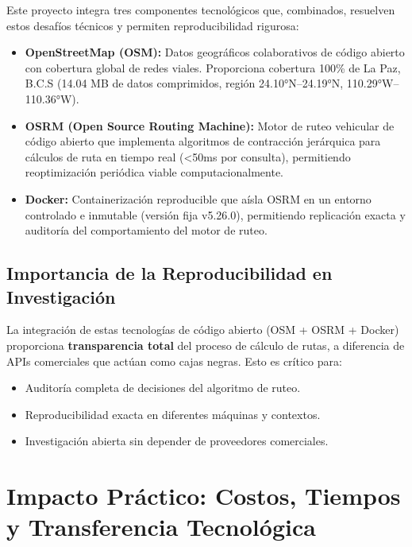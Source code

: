 Este proyecto integra tres componentes tecnológicos que, combinados, resuelven 
estos desafíos técnicos y permiten reproducibilidad rigurosa:

\begin{itemize}
    \item \textbf{OpenStreetMap (OSM):} Datos geográficos colaborativos de 
    código abierto con cobertura global de redes viales. Proporciona cobertura 
    100\% de La Paz, B.C.S (14.04 MB de datos comprimidos, región 
    24.10°N--24.19°N, 110.29°W--110.36°W).
    
    \item \textbf{OSRM (Open Source Routing Machine):} Motor de ruteo 
    vehicular de código abierto que implementa algoritmos de contracción 
    jerárquica para cálculos de ruta en tiempo real (<50ms por consulta), 
    permitiendo reoptimización periódica viable computacionalmente.
    
    \item \textbf{Docker:} Containerización reproducible que aísla OSRM en 
    un entorno controlado e inmutable (versión fija v5.26.0), permitiendo 
    replicación exacta y auditoría del comportamiento del motor de ruteo.
\end{itemize}

\subsection{Importancia de la Reproducibilidad en Investigación}

La integración de estas tecnologías de código abierto (OSM + OSRM + Docker) 
proporciona \textbf{transparencia total} del proceso de cálculo de rutas, 
a diferencia de APIs comerciales que actúan como cajas negras. Esto es 
crítico para:

\begin{itemize}
    \item Auditoría completa de decisiones del algoritmo de ruteo.
    
    \item Reproducibilidad exacta en diferentes máquinas y contextos.
    
    \item Investigación abierta sin depender de proveedores comerciales.
\end{itemize}

\section{Impacto Práctico: Costos, Tiempos y Transferencia Tecnológica}

